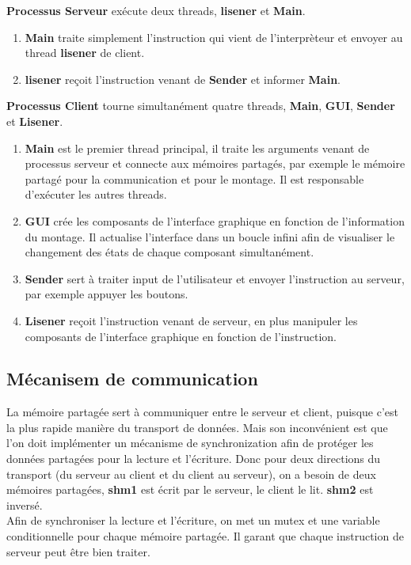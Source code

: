 \documentclass[14px]{article}
\begin{document}
\textbf{Processus Serveur} exécute deux threads, \textbf{lisener} et \textbf{Main}.
\begin{enumerate}
	\item \textbf{Main} traite simplement l'instruction qui vient de l'interprèteur et envoyer au thread \textbf{lisener} de client.
	\item \textbf{lisener} reçoit l'instruction venant de \textbf{Sender} et informer \textbf{Main}.
\end{enumerate}

\textbf{Processus Client} tourne simultanément quatre threads, \textbf{Main}, \textbf{GUI}, \textbf{Sender} et \textbf{Lisener}.
\begin{enumerate}
	\item \textbf{Main} est le premier thread principal, il traite les arguments venant de processus serveur et connecte aux mémoires partagés, par exemple le mémoire partagé pour la communication et pour le montage. Il est responsable d'exécuter les autres threads.
	\item \textbf{GUI} crée les composants de l'interface graphique en fonction de l'information du montage. Il actualise l'interface dans un boucle infini afin de visualiser le changement des états de chaque composant simultanément.
	\item \textbf{Sender} sert à traiter input de l'utilisateur et envoyer l'instruction au serveur, par exemple appuyer les boutons. 
	\item \textbf{Lisener} reçoit l'instruction venant de serveur, en plus manipuler les composants de l'interface graphique en fonction de l'instruction.
\end{enumerate}

\subsection{Mécanisem de communication}
La mémoire partagée sert à communiquer entre le serveur et client, puisque c'est la plus rapide manière du transport de données. Mais son inconvénient est que l'on doit implémenter un mécanisme de synchronization afin de protéger les données partagées pour la lecture et l'écriture. Donc pour deux directions du transport (du serveur au client et du client au serveur), on a besoin de deux mémoires partagées, \textbf{shm1} est écrit par le serveur, le client le lit. \textbf{shm2} est inversé.\\

Afin de synchroniser la lecture et l'écriture, on met un mutex et une variable conditionnelle pour chaque mémoire partagée. Il garant que chaque instruction de serveur peut être bien traiter.
\end{document}

